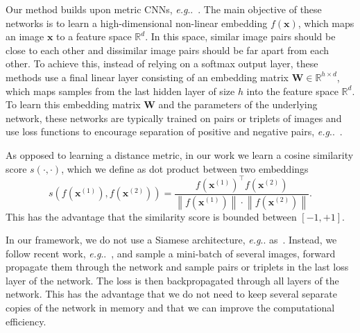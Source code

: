 \documentclass[10pt,journal,compsoc]{IEEEtran}
\makeatletter
\newcommand{\norm}[1]{\left\lVert#1\right\rVert}
\DeclareRobustCommand\onedot{\futurelet\@let@token\@onedot}
\def\@onedot{\ifx\@let@token.\else.\null\fi\xspace}
\def\eg{\emph{e.g}\onedot} \def\Eg{\emph{E.g}\onedot}
\makeatother
\begin{document}
Our method builds upon metric \acp{CNN}, \eg~\cite{huang2016local, oh2016deep, sohn2016improved, ustinova2016histogram}. The main objective of these networks is 
to learn a high-dimensional non-linear embedding $f(\boldsymbol{x})$, which maps an image $\boldsymbol{x}$ to a feature space $\mathbb{R}^d$. 
In this space, similar image pairs should be close
to each other and dissimilar image pairs should be far apart from each other. To achieve this, instead of 
relying on a softmax output layer, these methods
use a final linear layer consisting of an embedding matrix $\boldsymbol{W} \in \mathbb{R}^{h \times d}$, which maps 
samples from the last hidden layer of size $h$ into the feature space $\mathbb{R}^d$. 
To learn this embedding matrix $\boldsymbol{W}$ and the parameters of the underlying network, 
these networks are typically trained on pairs or triplets of images and use loss functions
to encourage separation of positive and negative pairs, \eg~\cite{oh2016deep}.

As opposed to learning a distance metric, in our work we learn a cosine similarity score $s(\cdot,
\cdot)$, which we define as dot product between two embeddings
\begin{equation}
s(f(\boldsymbol{x}^{(1)}), f(\boldsymbol{x}^{(2)})) = \frac{f(\boldsymbol{x}^{(1)})^{\top}f(\boldsymbol{x}^{(2)})}{\norm{f(\boldsymbol{x}^{(1)})} \cdot \norm{f(\boldsymbol{x}^{(2)})}}. 
\end{equation}
This has the
advantage that the similarity score is bounded between $\left[-1,+1\right]$.

In our framework, we do not use a Siamese architecture, \eg as~\cite{chopra2005contrastive, hadsell2006dimensionality}. Instead,
we follow recent work, \eg~\cite{oh2016deep, schroff2015facenet, ustinova2016histogram}, and 
sample a mini-batch of several images, forward propagate them through the network and sample pairs or triplets
in the last loss layer of the network. The loss is then backpropagated through all layers of the network. This has the advantage
that we do not need to keep several separate copies of the network in memory and that we can improve the computational efficiency. 
\end{document}
